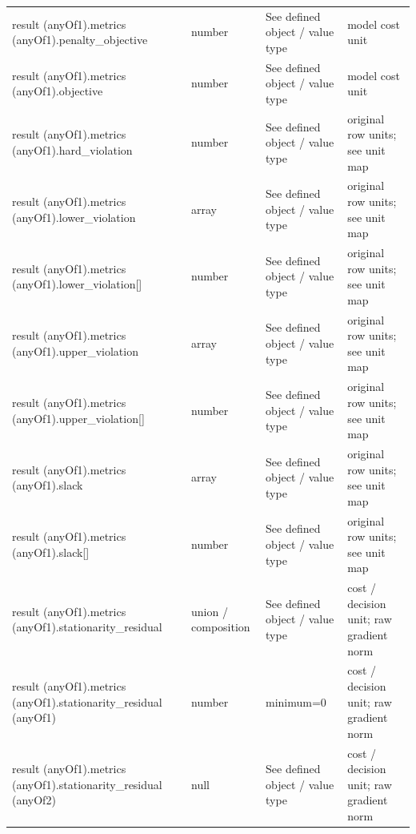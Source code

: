 \begin{longtable}{@{}>{\raggedright\arraybackslash}p{}>{\raggedright\arraybackslash}p{}>{\raggedright\arraybackslash}p{}>{\raggedright\arraybackslash}p{}@{}}
result (anyOf1).\allowbreak{}metrics (anyOf1).\allowbreak{}penalty\_\allowbreak{}objective & number & See defined object /\allowbreak{} value type & model cost unit\\
result (anyOf1).\allowbreak{}metrics (anyOf1).\allowbreak{}objective & number & See defined object /\allowbreak{} value type & model cost unit\\
result (anyOf1).\allowbreak{}metrics (anyOf1).\allowbreak{}hard\_\allowbreak{}violation & number & See defined object /\allowbreak{} value type & original row units; see unit map\\
result (anyOf1).\allowbreak{}metrics (anyOf1).\allowbreak{}lower\_\allowbreak{}violation & array & See defined object /\allowbreak{} value type & original row units; see unit map\\
result (anyOf1).\allowbreak{}metrics (anyOf1).\allowbreak{}lower\_\allowbreak{}violation[] & number & See defined object /\allowbreak{} value type & original row units; see unit map\\
result (anyOf1).\allowbreak{}metrics (anyOf1).\allowbreak{}upper\_\allowbreak{}violation & array & See defined object /\allowbreak{} value type & original row units; see unit map\\
result (anyOf1).\allowbreak{}metrics (anyOf1).\allowbreak{}upper\_\allowbreak{}violation[] & number & See defined object /\allowbreak{} value type & original row units; see unit map\\
result (anyOf1).\allowbreak{}metrics (anyOf1).\allowbreak{}slack & array & See defined object /\allowbreak{} value type & original row units; see unit map\\
result (anyOf1).\allowbreak{}metrics (anyOf1).\allowbreak{}slack[] & number & See defined object /\allowbreak{} value type & original row units; see unit map\\
result (anyOf1).\allowbreak{}metrics (anyOf1).\allowbreak{}stationarity\_\allowbreak{}residual & union /\allowbreak{} composition & See defined object /\allowbreak{} value type & cost /\allowbreak{} decision unit; raw gradient norm\\
result (anyOf1).\allowbreak{}metrics (anyOf1).\allowbreak{}stationarity\_\allowbreak{}residual (anyOf1) & number & minimum=\allowbreak{}0 & cost /\allowbreak{} decision unit; raw gradient norm\\
result (anyOf1).\allowbreak{}metrics (anyOf1).\allowbreak{}stationarity\_\allowbreak{}residual (anyOf2) & null & See defined object /\allowbreak{} value type & cost /\allowbreak{} decision unit; raw gradient norm\\

\end{longtable}
